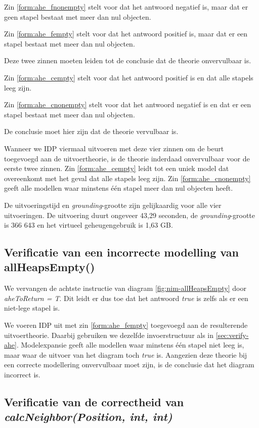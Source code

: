 Zin \ref{form:ahe_fnonempty} stelt voor dat het antwoord negatief is, maar dat er geen stapel bestaat met meer dan nul objecten.

Zin \ref{form:ahe_fempty} stelt voor dat het antwoord positief is, maar dat er een stapel bestaat met meer dan nul objecten.

Deze twee zinnen moeten leiden tot de conclusie dat de theorie onvervulbaar is.

Zin \ref{form:ahe_cempty} stelt voor dat het antwoord positief is en dat alle stapels leeg zijn.

Zin \ref{form:ahe_cnonempty} stelt voor dat het antwoord negatief is en dat er een stapel bestaat met meer dan nul objecten.

De conclusie moet hier zijn dat de theorie vervulbaar is.

Wanneer we IDP viermaal uitvoeren met deze vier zinnen om de beurt toegevoegd aan de uitvoertheorie, is de theorie inderdaad onvervulbaar voor de eerste twee zinnen. Zin \ref{form:ahe_cempty} leidt tot een uniek model dat overeenkomt met het geval dat alle stapels leeg zijn. Zin \ref{form:ahe_cnonempty} geeft alle modellen waar minstens \'e\'en stapel meer dan nul objecten heeft.

De uitvoeringstijd en \textit{grounding}-grootte zijn gelijkaardig voor alle vier uitvoeringen. De uitvoering duurt ongeveer 43,29 seconden, de \textit{grounding}-grootte is 366 643 en het virtueel geheugengebruik is 1,63 GB.

\subsection{Verificatie van een incorrecte modelling van allHeapsEmpty()}

We vervangen de achtste instructie van diagram \ref{fig:nim-allHeapsEmpty} door \textit{aheToReturn = T}. Dit leidt er dus toe dat het antwoord \textit{true} is zelfs als er een niet-lege stapel is.

We voeren IDP uit met zin \ref{form:ahe_fempty} toegevoegd aan de resulterende uitvoertheorie. Daarbij gebruiken we dezelfde invoerstructuur als in \ref{sec:verify-ahe}. Modelexpansie geeft alle modellen waar minstens \'e\'en stapel niet leeg is, maar waar de uitvoer van het diagram toch \textit{true} is. Aangezien deze theorie bij een correcte modellering onvervulbaar moet zijn, is de conclusie dat het diagram incorrect is.

\subsection{Verificatie van de correctheid van \textit{calcNeighbor(Position, int, int)}}\label{sec:verify-neighbor}

